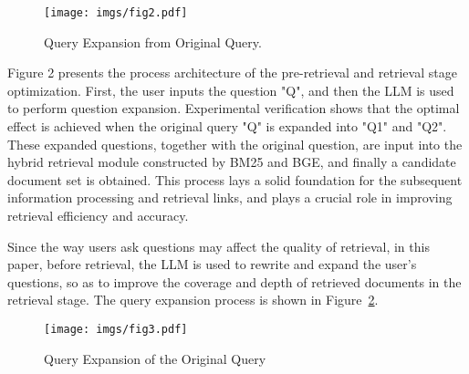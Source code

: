 \begin{figure} [h] 
    \centering
    \texttt{[image: imgs/fig2.pdf]}
    \caption{Query Expansion from Original Query.}
    \label{fig:fig2}
\end{figure}
Figure 2 presents the process architecture of the pre-retrieval and retrieval stage optimization. First, the user inputs the question "Q", and then the LLM is used to perform question expansion. Experimental verification shows that the optimal effect is achieved when the original query "Q" is expanded into "Q1" and "Q2". These expanded questions, together with the original question, are input into the hybrid retrieval module constructed by BM25 and BGE, and finally a candidate document set is obtained. This process lays a solid foundation for the subsequent information processing and retrieval links, and plays a crucial role in improving retrieval efficiency and accuracy.


Since the way users ask questions may affect the quality of retrieval, in this paper, before retrieval, the LLM is used to rewrite and expand the user's questions, so as to improve the coverage and depth of retrieved documents in the retrieval stage. The query expansion process is shown in Figure~\ref{fig:fig3}.


\begin{figure} [h] 
    \centering
    \texttt{[image: imgs/fig3.pdf]}
    \caption{Query Expansion of the Original Query}
    \label{fig:fig3}
\end{figure}

